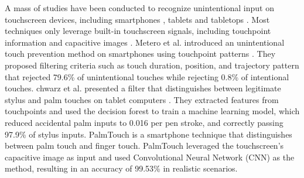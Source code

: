 A mass of studies have been conducted to recognize unintentional input on touchscreen devices, including smartphones \cite{2012-IdentifyUnint,2015-GestureOn,2018-PalmTouch,2019-BeyondUnint}, tablets \cite{2006-PadUnint,2014-PenUnint,2014-PalmRejection,2013-TapBoard,2016-TapBoard2} and tabletops \cite{2020-TabletopTouch}. Most techniques only leverage built-in touchscreen signals, including touchpoint information \cite{2012-IdentifyUnint,2006-PadUnint,2014-PalmRejection,2013-TapBoard,2016-TapBoard2} and capacitive images \cite{2018-PalmTouch,2014-PenUnint}.
Metero et al. introduced an unintentional touch prevention method on smartphones using touchpoint patterns \cite{2012-IdentifyUnint}. They proposed filtering criteria such as touch duration, position, and trajectory pattern that rejected 79.6\% of unintentional touches while rejecting 0.8\% of intentional touches.
chwarz et al. presented a filter that distinguishes between legitimate stylus and palm touches on tablet computers \cite{2014-PalmRejection}. They extracted features from touchpoints and used the decision forest to train a machine learning model, which reduced accidental palm inputs to 0.016 per pen stroke, and correctly passing 97.9\% of stylus inputs.
PalmTouch \cite{2018-PalmTouch} is a smartphone technique that distinguishes between palm touch and finger touch. PalmTouch leveraged the touchscreen's capacitive image as input and used Convolutional Neural Network (CNN) as the method, resulting in an accuracy of 99.53\% in realistic scenarios.


